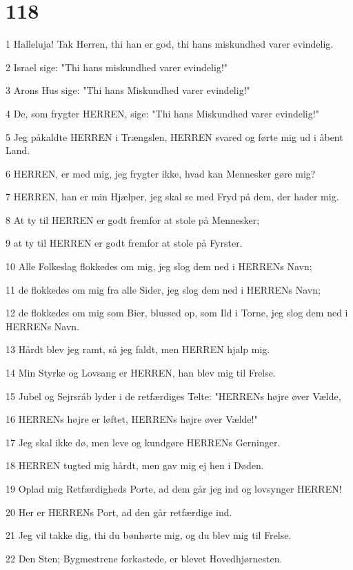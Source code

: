 \chapter{118}

\par 1 Halleluja! Tak Herren, thi han er god, thi hans miskundhed varer evindelig.
\par 2 Israel sige: "Thi hans miskundhed varer evindelig!"
\par 3 Arons Hus sige: "Thi hans Miskundhed varer evindelig!"
\par 4 De, som frygter HERREN, sige: "Thi hans Miskundhed varer evindelig!"
\par 5 Jeg påkaldte HERREN i Trængslen, HERREN svared og førte mig ud i åbent Land.
\par 6 HERREN, er med mig, jeg frygter ikke, hvad kan Mennesker gøre mig?
\par 7 HERREN, han er min Hjælper, jeg skal se med Fryd på dem, der hader mig.
\par 8 At ty til HERREN er godt fremfor at stole på Mennesker;
\par 9 at ty til HERREN er godt fremfor at stole på Fyrster.
\par 10 Alle Folkeslag flokkedes om mig, jeg slog dem ned i HERRENs Navn;
\par 11 de flokkedes om mig fra alle Sider, jeg slog dem ned i HERRENs Navn;
\par 12 de flokkedes om mig som Bier, blussed op, som Ild i Torne, jeg slog dem ned i HERRENs Navn.
\par 13 Hårdt blev jeg ramt, så jeg faldt, men HERREN hjalp mig.
\par 14 Min Styrke og Lovsang er HERREN, han blev mig til Frelse.
\par 15 Jubel og Sejrsråb lyder i de retfærdiges Telte: "HERRENs højre øver Vælde,
\par 16 HERRENs højre er løftet, HERRENs højre øver Vælde!"
\par 17 Jeg skal ikke dø, men leve og kundgøre HERRENs Gerninger.
\par 18 HERREN tugted mig hårdt, men gav mig ej hen i Døden.
\par 19 Oplad mig Retfærdigheds Porte, ad dem går jeg ind og lovsynger HERREN!
\par 20 Her er HERRENs Port, ad den går retfærdige ind.
\par 21 Jeg vil takke dig, thi du bønhørte mig, og du blev mig til Frelse.
\par 22 Den Sten; Bygmestrene forkastede, er blevet Hovedhjørnesten.
